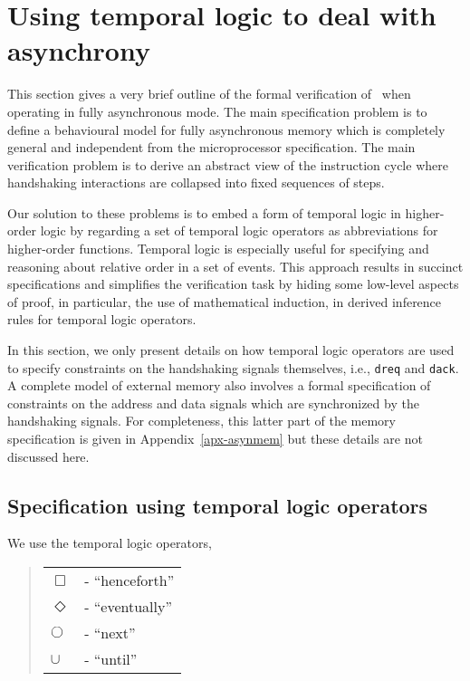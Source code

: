 \section{Using temporal logic to deal with asynchrony}
\label{sec-asyn}

This section gives a very brief outline of the formal verification
of \Tamarack\ when operating in fully asynchronous mode.
The main specification problem is to define a behavioural model
for fully asynchronous memory which is completely general and
independent from the microprocessor specification.
The main verification problem is to derive an abstract view of
the instruction cycle where handshaking interactions are collapsed
into fixed sequences of steps.

Our solution to these problems is to embed a form of
temporal logic in higher-order logic by regarding a set of
temporal logic operators as abbreviations for higher-order functions.
Temporal logic is especially useful for specifying and reasoning
about relative order in a set of events.
This approach results in succinct specifications and simplifies
the verification task by hiding some
low-level aspects of proof, in particular, the use of mathematical
induction, in derived inference rules for temporal logic operators.

In this section, we only present details on how temporal logic
operators are used to specify constraints on the handshaking signals
themselves, i.e., \verb"dreq" and \verb"dack".
A complete model of external memory also involves a formal specification
of constraints on the address and data signals which are synchronized by the
handshaking signals.  For completeness,
this latter part of the memory specification
is given in Appendix~\ref{apx-asynmem} but
these details are not discussed here.

\subsection{Specification using temporal logic operators}

We use the temporal logic operators,

\begin{quote}
\begin{tabular}{ll}
$\Box$ & - ``henceforth''\\
$\Diamond$ & -  ``eventually''\\
$\bigcirc$ & - ``next''\\
$\cup$ & - ``until''
\end{tabular}
\end{quote}

